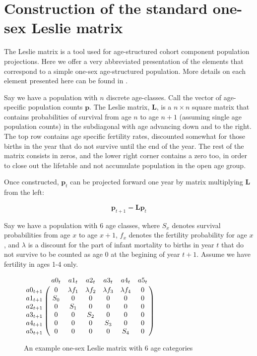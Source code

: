 \chapter{Construction of the standard one-sex Leslie matrix}
\label{Appendix:Caswell}
The Leslie matrix\citep{leslie1945use} is a tool used for age-structured cohort 
component population projections. Here we offer a very abbreviated presentation of the elements that
correspond to a simple one-sex age-structured population. More details on 
each element presented here can be found in \cite{caswell2001matrix}.

Say we have a population with $n$ discrete age-classes. Call the vector of
age-specific population counts $\textbf{p}$. The Leslie matrix, $\textbf{L}$, is a $n \times
n$ square matrix that contains probabilities of survival from age $n$ to age
$n+1$ (assuming single age population counts) in the subdiagonal with age
advancing down and to the right. The top row contains age specific fertility
rates, discounted somewhat for those births in the year that do not survive
until the end of the year. The rest of the matrix consists in zeros, and the
lower right corner contains a zero too, in order to close out the lifetable and
not accumulate population in the open age group.

Once constructed, $\textbf{p}_t$ can be projected forward one year by matrix
multiplying $\textbf{L}$ from the left:

\begin{equation}
\textbf{p}_{t+1} = \textbf{L}\textbf{p}_{t} 
\end{equation}

Say we have a population with 6 age classes, where
$S_x$ denotes survival probabilities from age $x$ to age $x+1$, $f_x$ denotes
the fertility probability for age $x$, and $\lambda$ is a discount for the part
of infant mortality to births in year $t$ that do not survive to be counted as
age 0 at the begining of year $t+1$. Assume we have fertility in ages 1-4 only.

\begin{figure}
\centering
\caption*{An example one-sex Leslie matrix with 6 age categories}
$\bordermatrix{{ }      & a0_t & a1_t     & a2_t &  a3_t & a4_t & a5_t\cr
                a0_{t+1} & 0 & \lambda f_1 & \lambda f_2 & \lambda f_3 & \lambda f_4 & 0\cr 
                a1_{t+1} & S_0  &  0       & 0    & 0     & 0   & 0   \cr
                a2_{t+1} & 0    &  S_1     & 0    & 0     & 0    & 0   \cr 
                a3_{t+1} & 0    &  0       & S_2  & 0     & 0    & 0   \cr 
                a4_{t+1} & 0    &  0       & 0    & S_3   & 0    & 0   \cr
                a5_{t+1} & 0    &  0       & 0    & 0     & S_4  & 0   }$
\end{figure}

